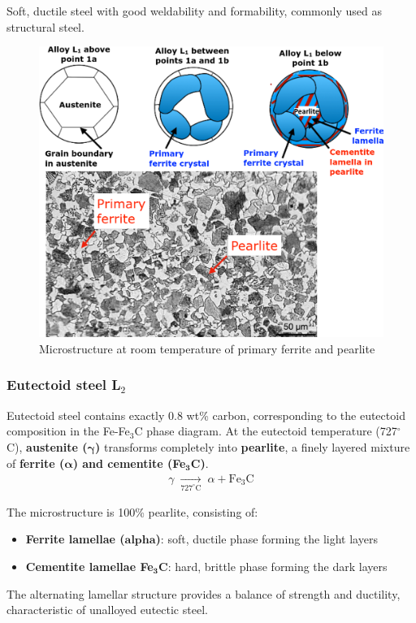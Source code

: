\documentclass{article}
\begin{document}
Soft, ductile steel with good weldability and formability, commonly used as structural steel.

\begin{figure}[ht!]
  \centering
  \includegraphics[width=.7\textwidth]{media/hypoeutectic_microstructure.png}
  \caption*{Microstructure at room temperature of primary ferrite and pearlite}
\end{figure}

\newpage
\subsubsection{Eutectoid steel L$_2$}
Eutectoid steel contains exactly 0.8 wt\% carbon, corresponding to the eutectoid composition
in the Fe-Fe$_3$C phase diagram. At the eutectoid temperature (727$^\circ$C), \textbf{austenite ($\bm{\gamma}$)}
transforms completely into \textbf{pearlite}, a finely layered mixture of
\textbf{ferrite ($\bm{\alpha}$) and cementite (Fe$_\mathbf{3}$C)}.
\begin{gather*}
  \gamma \;\xrightarrow[727^{\circ}\text{C}]{}\; \alpha + \mathrm{Fe}_3\mathrm{C}
\end{gather*}

The microstructure is 100\% pearlite, consisting of:
\begin{itemize}
  \item \textbf{Ferrite lamellae ($\bm{alpha}$)}: soft, ductile phase forming the light layers
  \item \textbf{Cementite lamellae Fe$_\mathbf{3}$C}: hard, brittle phase forming the dark layers
\end{itemize}

The alternating lamellar structure provides a balance of strength and ductility,
characteristic of unalloyed eutectic steel.
\end{document}
